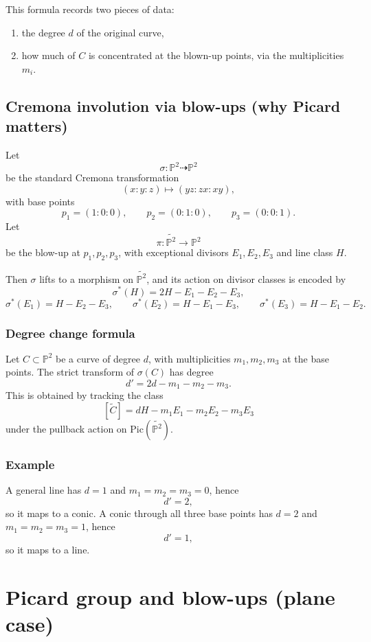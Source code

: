 \documentclass[12pt,a4paper]{article}
\theoremstyle{plain}
\theoremstyle{definition}      %
\begin{document}
This formula records two pieces of data:
\begin{enumerate}
	\item the degree $d$ of the original curve,
	\item how much of $C$ is concentrated at the blown-up points, via the multiplicities $m_i$.
\end{enumerate}

\subsection*{Cremona involution via blow-ups (why Picard matters)}

Let
\[
\sigma:\mathbb P^2\dashrightarrow \mathbb P^2
\]
be the standard Cremona transformation
\[
(x:y:z)\longmapsto (yz:zx:xy),
\]
with base points
\[
p_1=(1:0:0),
\qquad
p_2=(0:1:0),
\qquad
p_3=(0:0:1).
\]
Let
\[
\pi:\widetilde{\mathbb P^2}\to \mathbb P^2
\]
be the blow-up at $p_1,p_2,p_3$, with exceptional divisors $E_1,E_2,E_3$ and line class $H$.

Then $\sigma$ lifts to a morphism on $\widetilde{\mathbb P^2}$, and its action on divisor classes is encoded by
\[
\sigma^{*}(H)=2H-E_1-E_2-E_3,
\]
\[
\sigma^{*}(E_1)=H-E_2-E_3,
\qquad
\sigma^{*}(E_2)=H-E_1-E_3,
\qquad
\sigma^{*}(E_3)=H-E_1-E_2.
\]

\subsubsection*{Degree change formula}

Let $C\subset \mathbb P^2$ be a curve of degree $d$, with multiplicities $m_1,m_2,m_3$ at the base points.
The strict transform of $\sigma(C)$ has degree
\[
d' = 2d - m_1 - m_2 - m_3.
\]
This is obtained by tracking the class
\[
[\widetilde C]=dH-m_1E_1-m_2E_2-m_3E_3
\]
under the pullback action on $\mathrm{Pic}(\widetilde{\mathbb P^2})$.

\subsubsection*{Example}

A general line has $d=1$ and $m_1=m_2=m_3=0$, hence
\[
d'=2,
\]
so it maps to a conic.
A conic through all three base points has $d=2$ and $m_1=m_2=m_3=1$, hence
\[
d'=1,
\]
so it maps to a line.

\section*{Picard group and blow-ups (plane case)}
\end{document}
